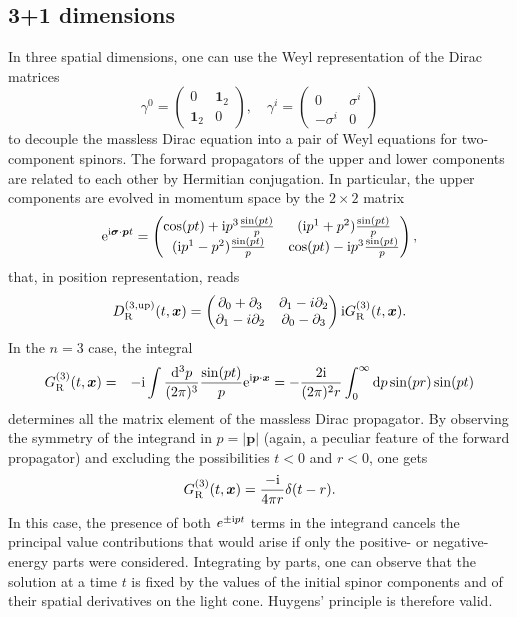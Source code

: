 \subsection{3+1 dimensions}
\label{sec:31dim}
In three spatial dimensions, one can use the Weyl representation of the Dirac matrices
\begin{equation}
\gamma^0 = \left( \begin{matrix} 0 & \mathbf{1}_2 \\ \mathbf{1}_2 & 0 \end{matrix} \right) , \quad \gamma^i = \left( \begin{matrix} 0 & \sigma^i \\ -\sigma^i & 0 \end{matrix} \right)
\end{equation}
to decouple the massless Dirac equation into a pair of Weyl equations for two-component spinors. The forward propagators of the upper and lower components are related to each other by Hermitian conjugation. In particular, the upper components are evolved in momentum space by the $2\times 2$ matrix
\begin{equation}
\mathrm{e}^{\mathrm{i}\bm{\sigma}\cdot\bm{p} t} = \left( \begin{matrix} \cos(pt) + \mathrm{i} p^3 \frac{\sin(pt)}{p} & (\mathrm{i} p^1 + p^2) \frac{\sin(pt)}{p} \\ (\mathrm{i} p^1 - p^2) \frac{\sin(pt)}{p} & \cos(pt) - \mathrm{i} p^3 \frac{\sin(pt)}{p}\end{matrix}  \right),
\end{equation} 
that, in position representation, reads
\begin{equation}
D_{\textrm{R}}^{(3,\textrm{up})}(t,\bm{x}) = \left( \begin{matrix} \partial_0 + \partial_3 & \partial_1 -i \partial_2  \\ \partial_1 -i \partial_2 & \partial_0 - \partial_3 \end{matrix}  \right) \mathrm{i} G_\textrm{R}^{(3)}(t,\bm{x}).
\end{equation}
In the $n=3$ case, the integral
\begin{eqnarray}
G_\textrm{R}^{(3)} (t,\bm{x}) & = & -\mathrm{i} \int \frac{\mathrm{d}^3p}{(2\pi)^3} \frac{\sin(pt)}{p} \mathrm{e}^{\mathrm{i}\bm{p}\cdot\bm{x}} = - \frac{2\mathrm{i}}{(2\pi)^2 r} \int_0^{\infty} \mathrm{d} p \sin(pr) \sin(pt)
\end{eqnarray}
determines all the matrix element of the massless Dirac propagator. By observing the symmetry of the integrand in $p=|\bm{p}|$ (again, a peculiar feature of the forward propagator) and excluding the possibilities $t<0$ and $r<0$, one gets
\begin{equation}
G_\textrm{R}^{(3)} (t,\bm{x}) = \frac{-\mathrm{i}}{4\pi r} \delta (t-r).
\end{equation}
In this case, the presence of both $e^{\pm \mathrm{i} p t}$ terms in the integrand cancels the principal value contributions that would arise if only the positive- or negative-energy parts were considered. Integrating by parts, one can observe that the solution at a time $t$ is fixed by the values of the initial spinor components and of their spatial derivatives on the light cone. Huygens' principle is therefore valid.




